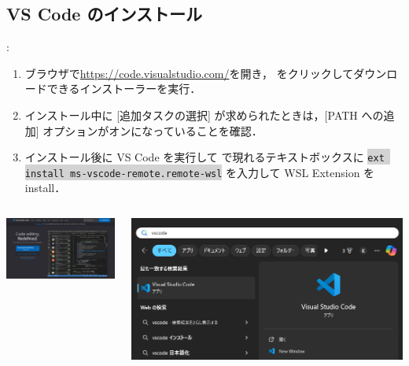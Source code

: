 \documentclass[aspectratio=169,dvipdfmx,cjk]{beamer}
\newcommand{\cmdline}[1]{
    \colorbox{lightgray}{\lstinline[style=command]{#1}}
}
\begin{document}
\subsection{VS Code のインストール}
\begin{frame}{\insertsection \thesubsection: \insertsubsection}
  \begin{enumerate}
    \item ブラウザで\href{https://code.visualstudio.com/}{https://code.visualstudio.com/}を開き， をクリックしてダウンロードできるインストーラーを実行．
    \item インストール中に [追加タスクの選択] が求められたときは，[PATH への追加] オプションがオンになっていることを確認．
    \item インストール後に VS Code を実行して  で現れるテキストボックスに \cmdline{ext install ms-vscode-remote.remote-wsl} を入力して WSL Extension を install．
  \end{enumerate}
  \begin{columns}
    \begin{column}{0.33\textwidth}
        \includegraphics[width=1.0\linewidth]{fig/vscode.png}
    \end{column}
    \begin{column}{0.33\textwidth}
      \includegraphics[width=1.0\linewidth]{fig/start-vscode.png}

\end{column}
\end{columns}
\end{frame}
\end{document}
